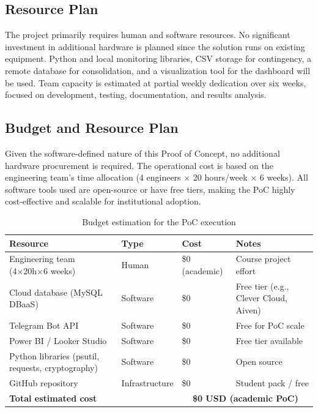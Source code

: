 \documentclass[12pt,a4paper]{article}
\begin{document}
\subsection{Resource Plan}
The project primarily requires human and software resources. No significant investment in additional hardware is planned since the solution runs on existing equipment. Python and local monitoring libraries, CSV storage for contingency, a remote database for consolidation, and a visualization tool for the dashboard will be used. Team capacity is estimated at partial weekly dedication over six weeks, focused on development, testing, documentation, and results analysis.

\subsection{Budget and Resource Plan}
Given the software-defined nature of this Proof of Concept, no additional hardware procurement is required. The operational cost is based on the engineering team's time allocation (4 engineers × 20 hours/week × 6 weeks). All software tools used are open-source or have free tiers, making the PoC highly cost-effective and scalable for institutional adoption.

\begin{table}[H]
\caption{Budget estimation for the PoC execution}
\centering
\begin{tabular}{|p{5cm}|p{3cm}|p{3cm}|p{2.5cm}|}
\hline
\textbf{Resource} & \textbf{Type} & \textbf{Cost} & \textbf{Notes} \\
\hline
Engineering team (4×20h×6 weeks) & Human & \$0 (academic) & Course project effort \\
\hline
Cloud database (MySQL DBaaS) & Software & \$0 & Free tier (e.g., Clever Cloud, Aiven) \\
\hline
Telegram Bot API & Software & \$0 & Free for PoC scale \\
\hline
Power BI / Looker Studio & Software & \$0 & Free tier available \\
\hline
Python libraries (psutil, requests, cryptography) & Software & \$0 & Open source \\
\hline
GitHub repository & Infrastructure & \$0 & Student pack / free \\
\hline
\textbf{Total estimated cost} & & \multicolumn{2}{|c|}{\textbf{\$0 USD (academic PoC)}} \\
\hline
\end{tabular}
\label{tab:budget}
\end{table}
\end{document}
